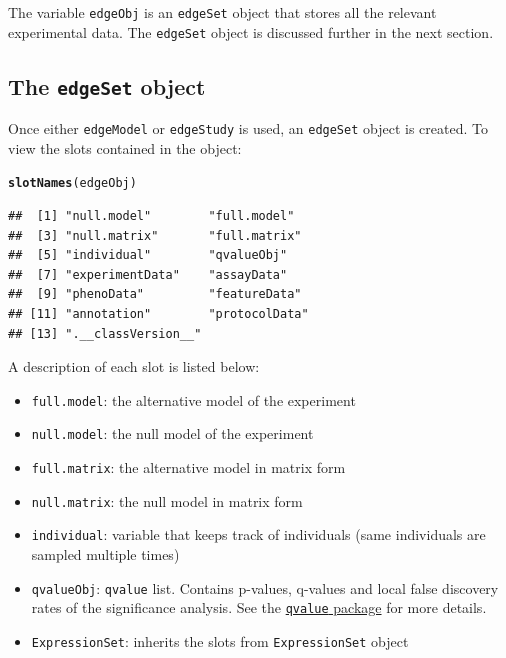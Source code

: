 \documentclass{article}\usepackage[]{graphicx}\usepackage[]{color}
\makeatletter
\newcommand{\hlstd}[1]{\textcolor[rgb]{0.345,0.345,0.345}{#1}}%
\newcommand{\hlkwd}[1]{\textcolor[rgb]{0.737,0.353,0.396}{\textbf{#1}}}%
\newenvironment{kframe}{%
 \def\at@end@of@kframe{}%
 \ifinner\ifhmode%
  \def\at@end@of@kframe{\end{minipage}}%
  \begin{minipage}{\columnwidth}%
 \fi\fi%
 \def\FrameCommand##1{\hskip\@totalleftmargin \hskip-\fboxsep
 \colorbox{shadecolor}{##1}\hskip-\fboxsep
     \hskip-\linewidth \hskip-\@totalleftmargin \hskip\columnwidth}%
 \MakeFramed {\advance\hsize-\width
   \@totalleftmargin\z@ \linewidth\hsize
   \@setminipage}}%
 {\par\unskip\endMakeFramed%
 \at@end@of@kframe}
\newenvironment{knitrout}{}{} %
\makeatother
\begin{document}
The variable {\tt edgeObj} is an {\tt edgeSet} object that stores all the relevant experimental data. The {\tt edgeSet} object is discussed further in the next section. 

\subsection{The {\tt edgeSet} object}
Once either {\tt edgeModel} or {\tt edgeStudy} is used, an {\tt edgeSet} object is created. To view the slots contained in the object:
\begin{knitrout}
\color{fgcolor}\begin{kframe}
\begin{alltt}
\hlkwd{slotNames}\hlstd{(edgeObj)}
\end{alltt}
\begin{verbatim}
##  [1] "null.model"        "full.model"       
##  [3] "null.matrix"       "full.matrix"      
##  [5] "individual"        "qvalueObj"        
##  [7] "experimentData"    "assayData"        
##  [9] "phenoData"         "featureData"      
## [11] "annotation"        "protocolData"     
## [13] ".__classVersion__"
\end{verbatim}
\end{kframe}
\end{knitrout}
A description of each slot is listed below: 
\begin{itemize}
\item {\tt full.model}: the alternative model of the experiment
\item {\tt null.model}: the null model of the experiment
\item {\tt full.matrix}: the alternative model in matrix form
\item {\tt null.matrix}: the null model in matrix form
\item {\tt individual}: variable that keeps track of individuals (same individuals are sampled multiple times)
\item {\tt qvalueObj}: {\tt qvalue} list. Contains p-values, q-values and local false discovery rates of the significance analysis. See the \href{http://www.bioconductor.org/packages/release/bioc/html/qvalue.html}{{\tt qvalue} package} for more details.
\item {\tt ExpressionSet}: inherits the slots from {\tt ExpressionSet} object
\end{itemize}
\end{document}
